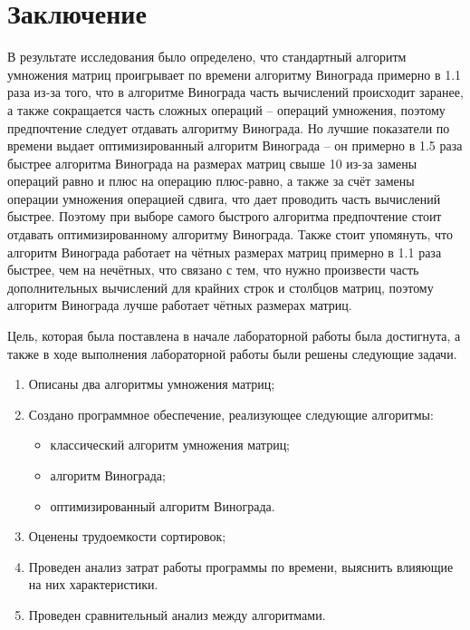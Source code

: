 \chapter*{Заключение}

В результате исследования было определено, что стандартный алгоритм умножения матриц проигрывает по времени алгоритму Винограда примерно в 1.1 раза из-за того, что в алгоритме Винограда часть вычислений происходит заранее, а также сокращается часть сложных операций -- операций умножения, поэтому предпочтение следует отдавать алгоритму Винограда. 
Но лучшие показатели по времени выдает оптимизированный алгоритм Винограда -- он примерно в 1.5 раза быстрее алгоритма Винограда на размерах матриц свыше 10 из-за замены операций равно и плюс на операцию плюс-равно, а также за счёт замены операции умножения операцией сдвига, что дает проводить часть вычислений быстрее. 
Поэтому при выборе самого быстрого алгоритма предпочтение стоит отдавать оптимизированному алгоритму Винограда. 
Также стоит упомянуть, что алгоритм Винограда работает на чётных размерах матриц примерно в 1.1 раза быстрее, чем на нечётных, что связано с тем, что нужно произвести часть дополнительных вычислений для крайних строк и столбцов матриц, поэтому алгоритм Винограда лучше работает чётных размерах матриц.

Цель, которая была поставлена в начале лабораторной работы была достигнута, а также в ходе выполнения лабораторной работы были решены следующие задачи.
\begin{enumerate}[label={\arabic*)}]
	\item Описаны два алгоритмы умножения матриц;
	\item Создано программное обеспечение, реализующее следующие алгоритмы:
	\begin{itemize}[label=---]
		\item классический алгоритм умножения матриц;
		\item алгоритм Винограда;
		\item оптимизированный алгоритм Винограда.
	\end{itemize}
	\item Оценены трудоемкости сортировок;
	\item Проведен анализ затрат работы программы по времени, выяснить влияющие на них характеристики.
	\item Проведен сравнительный анализ между алгоритмами.
\end{enumerate}